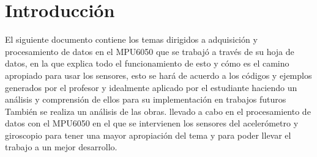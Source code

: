 \section{Introducción} \label{sec:introduccion}


El siguiente documento contiene los temas dirigidos a
adquisición y procesamiento de datos en el MPU6050
que se trabajó a través de su hoja de datos, en la que
explica todo el funcionamiento de esto y cómo es el camino
apropiado para usar los sensores, esto se hará de acuerdo
a los códigos y ejemplos generados por el profesor y
idealmente aplicado por el estudiante haciendo un
análisis y comprensión de ellos para su implementación en
trabajos futuros También se realiza un análisis de las obras.
llevado a cabo en el procesamiento de datos con el
MPU6050 en el que se intervienen los sensores del acelerómetro
y giroscopio para tener una mayor apropiación del tema y
para poder llevar el trabajo a un mejor desarrollo.
